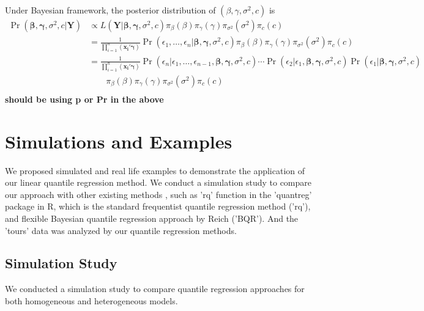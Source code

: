 \documentclass[12pt]{article}
\DeclareMathOperator{\pr}{Pr}
\begin{document}
Under Bayesian framework, the posterior distribution of $(\beta,
\gamma, \sigma^2, c)$ is 
\begin{align*}
\pr(\bm{\beta}, \bm{\gamma}, \sigma^2, c|\bm{Y}) & \propto L(\bm{Y}|
\bm{\beta}, \bm{\gamma}, \sigma^2, c) \pi_{\beta}(\beta)
\pi_{\gamma}(\gamma) \pi_{\sigma^2}(\sigma^2) \pi_c(c) \\
& = \frac{1}{\prod_{i=1}^n (\bm{x_i'\gamma})} \pr \left( \epsilon_1,
  \ldots, \epsilon_n | \bm{\beta}, \bm{\gamma}, \sigma^2, c\right)
\pi_{\beta}(\beta)
\pi_{\gamma}(\gamma) \pi_{\sigma^2}(\sigma^2) \pi_c(c) \\
& = \frac{1}{\prod_{i=1}^n (\bm{x_i'\gamma})} \pr \left(\epsilon_n| \epsilon_1,
  \ldots, \epsilon_{n-1} , \bm{\beta}, \bm{\gamma}, \sigma^2, c\right)
\cdots  \pr \left(\epsilon_2| \epsilon_1, \bm{\beta}, \bm{\gamma},
  \sigma^2, c\right)  \pr \left(\epsilon_1| \bm{\beta}, \bm{\gamma},
  \sigma^2, c\right)\\
& \qquad 
\pi_{\beta}(\beta)
\pi_{\gamma}(\gamma) \pi_{\sigma^2}(\sigma^2) \pi_c(c) \\
\end{align*}
{\bf should be using p or Pr in the above}

\section{Simulations and Examples}

We proposed simulated and real life examples to demonstrate the
application of our linear quantile regression method.  We
conduct a simulation study to compare our approach with other existing
methods , such as 'rq' function in the 'quantreg' package in R, which
is the standard frequentist quantile regression method ('rq'), and
flexible Bayesian quantile regression approach by Reich
('BQR'). And the 'tours' data was analyzed by our quantile
  regression methods. 

\subsection{Simulation Study}
We conducted a simulation study to compare quantile regression approaches
for both homogeneous and heterogeneous models. 
\end{document}
